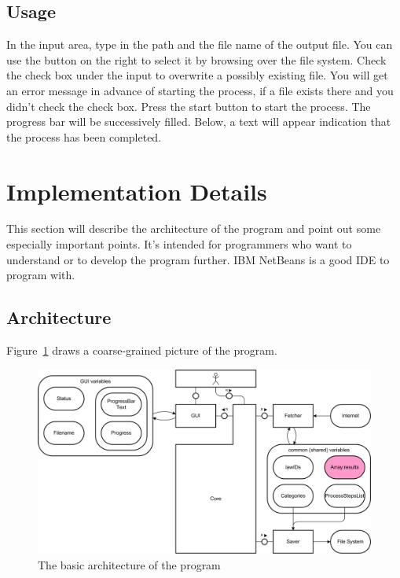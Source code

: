 \documentclass{scrartcl}
\begin{document}
\subsection{Usage}
In the input area, type in the path and the file name of the output file. You can use the button on the right to select it by browsing over the file system. Check the check box under the input to overwrite a possibly existing file. You will get an error message in advance of starting the process, if a file exists there and you didn't check the check box. Press the start button to start the process. The progress bar will be successively filled. Below, a text will appear indication that the process has been completed.





\section{Implementation Details}
This section will describe the architecture of the program and point out some especially important points. It's intended for programmers who want to understand or to develop the program further. IBM NetBeans is a good IDE to program with.



\subsection{Architecture}
Figure~\ref{Architecture} draws a coarse-grained picture of the program.
  \begin{figure}[ht]
  \begin{center}
  \includegraphics[width = \textwidth]{Architecture.png}
  \caption{The basic architecture of the program}
  \label{Architecture}
  \end{center}
  \end{figure}
\end{document}
